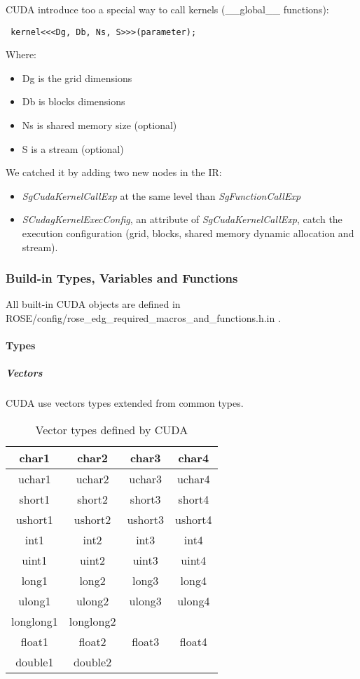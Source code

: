 CUDA introduce too a special way to call kernels (\_\_global\_\_ functions):
\begin{verbatim} kernel<<<Dg, Db, Ns, S>>>(parameter); \end{verbatim}
Where:
\begin{itemize}
	\item Dg is the grid dimensions
	\item Db is blocks dimensions
	\item Ns is shared memory size (optional)
	\item S is a stream (optional)
\end{itemize}
We catched it by adding two new nodes in the IR: 
\begin{itemize}
	\item \emph{SgCudaKernelCallExp} at the same level than \emph{SgFunctionCallExp}
	\item \emph{SCudagKernelExecConfig}, an attribute of \emph{SgCudaKernelCallExp}, catch the execution configuration (grid, blocks, shared memory dynamic allocation and stream).
\end{itemize}

			\subsubsection{Build-in Types, Variables and Functions}
			
All built-in CUDA objects are defined in ROSE/config/rose\_edg\_required\_macros\_and\_functions.h.in .
			
				\paragraph{Types}
			
					\subparagraph{Vectors}
					
CUDA use vectors types extended from common types.
\begin{table}[!h]
	\caption{Vector types defined by CUDA}
	\center
	\begin{tabular}{|c|c|c|c|} \hline
	char1 & char2 & char3 & char4 \\\hline
	uchar1 & uchar2 & uchar3 & uchar4 \\\hline
	short1 & short2 & short3 & short4 \\\hline
	ushort1 & ushort2 & ushort3 & ushort4 \\\hline
	int1 & int2 & int3 & int4 \\\hline
	uint1 & uint2 & uint3 & uint4 \\\hline
	long1 & long2 & long3 & long4 \\\hline
	ulong1 & ulong2 & ulong3 & ulong4 \\\hline
	longlong1 & longlong2 &  & \\\hline
	float1 & float2 & float3 & float4 \\\hline
	double1 & double2 &  & \\\hline
	\end{tabular}
	\label{heterogeneous:tabCudaVector}
\end{table}

